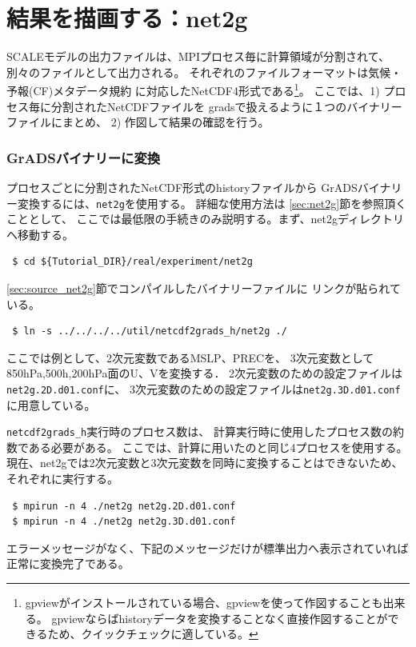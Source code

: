 \section{結果を描画する：net2g} \label{sec:quicklook}

SCALEモデルの出力ファイルは、MPIプロセス毎に計算領域が分割されて、別々のファイルとして出力される。
それぞれのファイルフォーマットは気候・予報(CF)メタデータ規約
に対応したNetCDF4形式である\footnote{gpviewがインストールされている場合、gpviewを使って作図することも出来る。
gpviewならばhistoryデータを変換することなく直接作図することができるため、クイックチェックに適している。}。
ここでは、1) プロセス毎に分割されたNetCDFファイルを
gradsで扱えるように１つのバイナリーファイルにまとめ、
2) 作図して結果の確認を行う。


\subsubsection{GrADSバイナリーに変換}
プロセスごとに分割されたNetCDF形式のhistoryファイルから
GrADSバイナリー変換するには、\verb|net2g|を使用する。
詳細な使用方法は \ref{sec:net2g}節を参照頂くこととして、
ここでは最低限の手続きのみ説明する。まず、net2gディレクトリへ移動する。
\begin{verbatim}
 $ cd ${Tutorial_DIR}/real/experiment/net2g
\end{verbatim}

\ref{sec:source_net2g}節でコンパイルしたバイナリーファイルに
リンクが貼られている。
\begin{verbatim}
 $ ln -s ../../../../util/netcdf2grads_h/net2g ./
\end{verbatim}
ここでは例として、2次元変数であるMSLP、PRECを、
3次元変数として850hPa,500h,200hPa面のU、Vを変換する．
2次元変数のための設定ファイルは\verb|net2g.2D.d01.conf|に、
3次元変数のための設定ファイルは\verb|net2g.3D.d01.conf|に用意している。

\verb|netcdf2grads_h|実行時のプロセス数は、
計算実行時に使用したプロセス数の約数である必要がある。
ここでは、計算に用いたのと同じ4プロセスを使用する。
現在、net2gでは2次元変数と3次元変数を同時に変換することはできないため、
それぞれに実行する。
\begin{verbatim}
 $ mpirun -n 4 ./net2g net2g.2D.d01.conf
 $ mpirun -n 4 ./net2g net2g.3D.d01.conf
\end{verbatim}
エラーメッセージがなく、下記のメッセージだけが標準出力へ表示されていれば正常に変換完了である。\\

